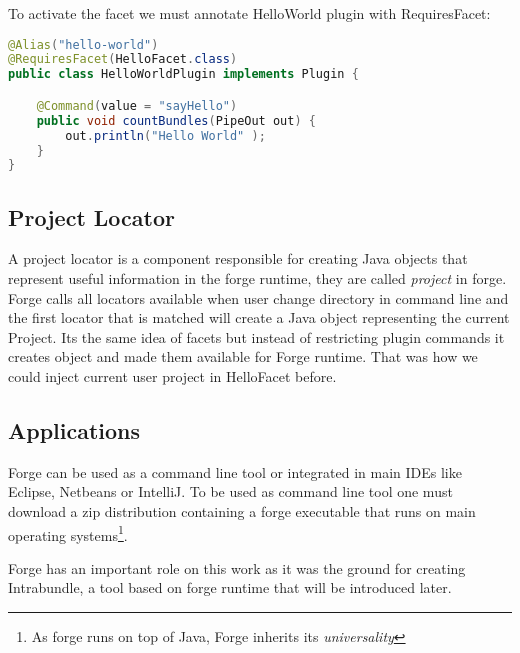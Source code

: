 To activate the facet we must annotate HelloWorld plugin with RequiresFacet:

\begin{lstlisting}[language=java,label=forge-plugin-facet,caption=Forge plugin with facet example]
@Alias("hello-world")
@RequiresFacet(HelloFacet.class)
public class HelloWorldPlugin implements Plugin {

    @Command(value = "sayHello")
    public void countBundles(PipeOut out) {
        out.println("Hello World" );
    }
}
\end{lstlisting}

\subsection{Project Locator}
\label{sec:forge:locator}
 A project locator is a component responsible for creating Java objects that represent useful information in the forge runtime, they are called \emph{project} in forge. Forge calls all locators available when user change directory in command line and the first locator that is matched will create a Java object representing the current Project. Its the same idea of facets but instead of restricting plugin commands it creates object and made them available for Forge runtime. That was how we could inject current user project in HelloFacet before.

\subsection{Applications}
Forge can be used as a command line tool or integrated in main IDEs like Eclipse, Netbeans or IntelliJ. To be used as command line tool one must download a zip distribution containing a forge executable that runs on main operating systems\footnote{As forge runs on top of Java, Forge inherits its \emph{universality}}.    

Forge has an important role on this work as it was the ground for creating Intrabundle, a tool based on forge runtime that will be introduced later.